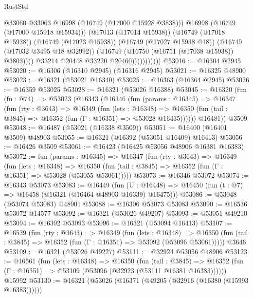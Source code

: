 \begin{lexlean}{RustStd}
\begin{coremodule}
                                  @33060
                                  @33063
                                  @16998
                                  (@16749 (@17000 @15928 @3838)))
                                @16998
                                (@16749 (@17000 @15918 @15934)))
                              (@17013 (@17014 @15938))
                              (@16749 (@17018 @15938))
                              (@16749 (@17023 @15938))
                              (@16749 (@17027 @15938 @18))
                              (@16749 (@17032 @3495 @18 @32992))
                              (@16749 (@16750 (@16751 (@17038 @15938)) @3803))))
                          @33214
                          @20448
                          @33220
                          @20460)))))))))))
@53016 := @16304 @2945
@53020 := @16306 (@16310 @2945) (@16316 @2945)
@53021 := @16325 @48900
@53023 := @16321 (@53021 @16340)
@53025 := @16363 (@16364 @2945)
@53026 := @16359 @53025
@53028 := @16321 (@53026 @16388)
@53045 := @16320
    (fun (fn : @74) =>
    @53023
      (@16343
        (@16346
          (fun (params : @16345) =>
          @16347
            (fun (rty : @3643) =>
            @16349
              (fun (lets : @16348) =>
              @16350 (fun (tail : @3845) => @16352 (fun (Γ : @16351) => @53028 @16435))))))
        @16481))
    @3509
@53048 := @16487 (@53021 (@16338 @3509))
@53051 := @16400 (@16401 @3509) @48903
@53055 := @16321 (@16392 (@53051 @16409) @16413)
@53056 := @16426 @3509
@53061 := @16423 (@16425 @53056 @48906 @16381 @16383)
@53072 := fun (params : @16345) =>
  @16347
    (fun (rty : @3643) =>
    @16349
      (fun (lets : @16348) =>
      @16350 (fun (tail : @3845) => @16352 (fun (Γ : @16351) => @53028 (@53055 @53061)))))
@53073 := @16346 @53072
@53074 := @16343 @53073
@53083 := @16449
    (fun (U : @16448) => @16450 (fun (t : @7) => @16458 (@16321 (@16464 @48903 @16339) @16475)))
@53086 := @53048 (@53074 @53083) @48901
@53088 := @16306 @53073 @53083
@53090 := @16536 @53072 @14577
@53092 := @16321 (@53026 @49207)
@53093 := @53051 @49210
@53094 := @16392 @53093
@53096 := @16321 (@53094 @16413)
@53107 := @16539
    (fun (rty : @3643) =>
    @16349
      (fun (lets : @16348) =>
      @16350 (fun (tail : @3845) => @16352 (fun (Γ : @16351) => @53092 (@53096 @53061)))))
    @3646
@53109 := @16321 (@53026 @49227)
@53111 := @32924 @53056 @48906
@53123 := @16561
    (fun (lets : @16348) =>
    @16350
      (fun (tail : @3845) =>
      @16352 (fun (Γ : @16351) => @53109 (@53096 (@32923 (@53111 @16381 @16383))))))
    @15992
@53130 := @16321 (@53026 (@16371 (@49205 (@32916 (@16380 (@15993 @16383))))))

\end{coremodule}
\end{lexlean}
